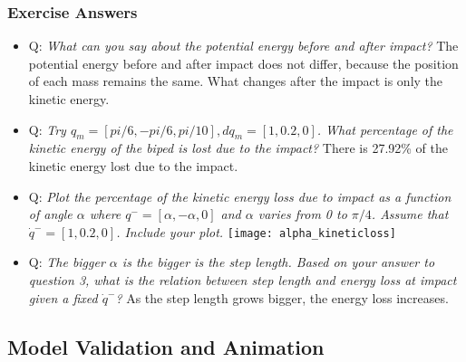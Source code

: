\subsubsection{Exercise Answers}
\begin{itemize}
\item Q: \emph{What can you say about the potential energy before and after impact?} 
The potential energy before and after impact does not differ, because the position of each mass remains the same. What changes after the impact is only the kinetic energy.
\item Q: \emph{Try $q_m = [pi/6, -pi/6, pi/10], dq_m = [1, 0.2, 0]$. What percentage of the kinetic energy of the biped is lost due to the impact?}  
There is 27.92\% of the kinetic energy lost due to the impact. 
\item Q: \emph{Plot the percentage of the kinetic energy loss due to impact as a function of angle $\alpha$ where $q^- = [\alpha, -\alpha, 0]$  and $\alpha$ varies from 0 to $\pi/4$. Assume that $\dot q^- = [1, 0.2, 0]$. Include your plot.}
\texttt{[image: alpha\_kineticloss]}
\item Q: \emph{The bigger $\alpha$ is the bigger is the step length. Based on your answer to question 3, what is the relation between step length and energy loss at impact given a fixed $\dot q^-$?}
As the step length grows bigger, the energy loss increases.    
\end{itemize}

\subsection{Model Validation and Animation}
\label{sec:validation}


